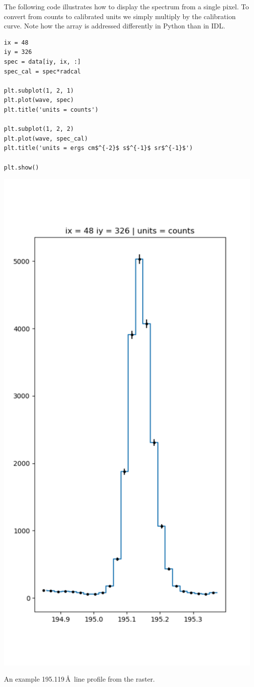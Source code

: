 The following code illustrates how to display the spectrum from a single pixel. To convert from
counts to calibrated units we simply multiply by the calibration curve. Note how the array is
addressed differently in Python than in IDL.
\begin{lstlisting}
ix = 48
iy = 326
spec = data[iy, ix, :]
spec_cal = spec*radcal

plt.subplot(1, 2, 1)
plt.plot(wave, spec)
plt.title('units = counts')

plt.subplot(1, 2, 2)
plt.plot(wave, spec_cal)
plt.title('units = ergs cm$^{-2}$ s$^{-1}$ sr$^{-1}$')

plt.show()
\end{lstlisting}
\begin{marginfigure}
  \centerline{\includegraphics[clip,width=\linewidth]{figures/test_plot.pdf}}
  \caption{An example  195.119\,\AA\ line profile from the raster.}
  \label{fig:spectrum}
\end{marginfigure}

